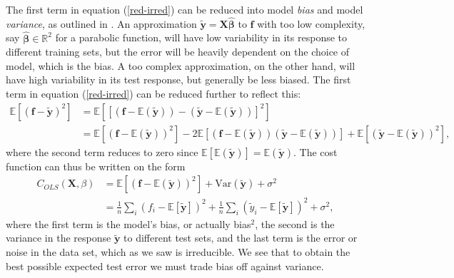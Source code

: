 \documentclass[]{article}
\begin{document}
The first term in equation (\ref{red-irred}) can be reduced into model \textit{bias} and model \textit{variance}, as outlined in \cite{friedman2001elements}. An approximation $\mathbf{\tilde{y}} = \mathbf{X\hat{\beta}}$ to $\mathbf{f}$ with too low complexity, say $\mathbf{\hat{\beta}} \in \mathbb{R}^2$ for a parabolic function, will have low variability in its response to different training sets, but the error will be heavily dependent on the choice of model, which is the bias. A too complex approximation, on the other hand, will have high variability in its test response, but generally be less biased. The first term in equation (\ref{red-irred}) can be reduced further to reflect this:
\begin{equation}
\begin{aligned}
\mathbb{E}[(\mathbf{f} - \mathbf{\tilde{y}})^2] &= \mathbb{E}[[(\mathbf{f} - \mathbb{E}(\mathbf{\tilde{y}})) - (\mathbf{\tilde{y}}- \mathbb{E}(\mathbf{\tilde{y}}))]^2] \\ 
&= \mathbb{E}[(\mathbf{f} - \mathbb{E}(\mathbf{\tilde{y}}))^2] - 2\mathbb{E}[(\mathbf{f} - \mathbb{E}(\mathbf{\tilde{y}}))(\mathbf{\tilde{y}}- \mathbb{E}(\mathbf{\tilde{y}}))] + \mathbb{E}[(\mathbf{\tilde{y}}- \mathbb{E}(\mathbf{\tilde{y}}))^2],
\end{aligned}
\end{equation}
where the second term reduces to zero since $\mathbb{E}[\mathbb{E}(\mathbf{\tilde{y}})] = \mathbb{E}(\mathbf{\tilde{y}})$. The cost function can thus be written on the form
\begin{equation}
\begin{aligned}
\label{bias-variance}
C_{OLS}(\mathbf{X},\mathbb{\beta}) &= \mathbb{E}[(\mathbf{f} - \mathbb{E}(\mathbf{\tilde{y}}))^2] + \mathrm{Var}(\mathbf{\tilde{y}}) + \sigma^2 \\
&=\frac{1}{n}\sum_i(f_i-\mathbb{E}\left[\boldsymbol{\tilde{y}}\right])^2+\frac{1}{n}\sum_i(\tilde{y}_i-\mathbb{E}\left[\boldsymbol{\tilde{y}}\right])^2+\sigma^2,
\end{aligned}
\end{equation}
where the first term is the model's bias, or actually bias$^2$, the second is the variance in the response $\mathbf{\tilde{y}}$ to different test sets, and the last term is the error or noise in the data set, which as we saw is irreducible. We see that to obtain the best possible expected test error we must trade bias off against variance.
\end{document}

